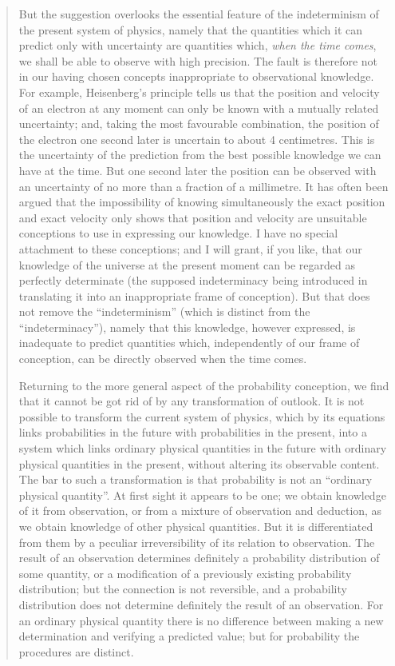 \documentclass{article}
\begin{document}
\begin{quote}
    But the suggestion overlooks the essential feature of the indeterminism of the present system of physics, namely that the quantities which it can predict only with uncertainty are quantities which, \emph{when the time comes}, we shall be able to observe with high precision.  The fault is therefore not in our having chosen concepts inappropriate to observational knowledge.  For example, Heisenberg's principle tells us that the position and velocity of an electron at any moment can only be known with a mutually related uncertainty; and, taking the most favourable combination, the position of the electron one second later is uncertain to about 4 centimetres.  This is the uncertainty of the prediction from the best possible knowledge we can have at the time.  But one second later the position can be observed with an uncertainty of no more than a fraction of a millimetre.  It has often been argued that the impossibility of knowing simultaneously the exact position and exact velocity only shows that position and velocity are unsuitable conceptions to use in expressing our knowledge.  I have no special attachment to these conceptions; and I will grant, if you like, that our knowledge of the universe at the present moment can be regarded as perfectly determinate (the supposed indeterminacy being introduced in translating it into an inappropriate frame of conception).  But that does not remove the ``indeterminism'' (which is distinct from the ``indeterminacy''), namely that this knowledge, however expressed, is inadequate to predict quantities which, independently of our frame of conception, can be directly observed when the time comes.  
    
    Returning to the more general aspect of the probability conception, we find that it cannot be got rid of by any transformation of outlook.  It is not possible to transform the current system of physics, which by its equations links probabilities in the future with probabilities in the present, into a system which links ordinary physical quantities in the future with ordinary physical quantities in the present, without altering its observable content.  The bar to such a transformation is that probability is not an ``ordinary physical quantity''.  At first sight it appears to be one; we obtain knowledge of it from observation, or from a mixture of observation and deduction, as we obtain knowledge of other physical quantities.  But it is differentiated from them by a peculiar irreversibility of its relation to observation.  The result of an observation determines definitely a probability distribution of some quantity, or a modification of a previously existing probability distribution; but the connection is not reversible, and a probability distribution does not determine definitely the result of an observation.  For an ordinary physical quantity there is no difference between making a new determination and verifying a predicted value; but for probability the procedures are distinct.  


\end{quote}
\end{document}
